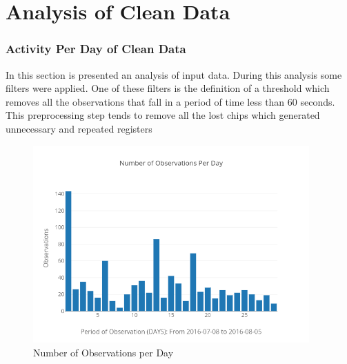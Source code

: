 \documentclass[11pt,fleqn]{book} %
\begin{document}
\chapter{Analysis of Clean Data}
\normalsize%
\subsection{Activity Per Day of Clean Data}%
\label{subsec:Activity Per Day of Clean Data}%
In this section is presented an analysis of input data. During this analysis some filters were applied. One of these filters is the definition of a threshold which removes all the observations that fall in a period of time less than 60 seconds. This preprocessing step tends to  remove all the lost chips which generated unnecessary and repeated registers %


\begin{figure}[h!]%
\centering%
\includegraphics[width=400px]{Pictures/Morelia Hive 1observationsPerdayClean.png}%
\caption{Number of Observations per Day}%
\end{figure}
\end{document}
